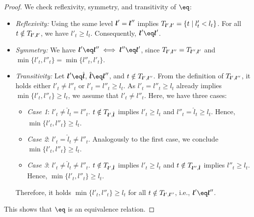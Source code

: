 \begin{proof}
  We check reflexivity, symmetry, and transitivity of $\eq$:
  \begin{itemize}
    \item
    \emph{Reflexivity:}
    Using the same level ${\boldsymbol{l}}' = {\boldsymbol{l}}''$ implies
    $T_{{\boldsymbol{l}}',{\boldsymbol{l}}'} = \{t \mid l'_t < l_t\}$.
    For all $t \notin T_{{\boldsymbol{l}}',{\boldsymbol{l}}'}$, we have $l'_t \ge l_t$.
    Consequently, $\*l' \eq \*l'$.
    
    \item
    \emph{Symmetry:}
    We have
    $\*l' \eq \*l'' \iff \*l'' \eq \*l'$, since
    $T_{{\boldsymbol{l}}',{\boldsymbol{l}}''} = T_{{\boldsymbol{l}}'',{\boldsymbol{l}}'}$ and
    $\min\{l'_t, l''_t\} = \min\{l''_t, l'_t\}$.
    
    \item
    \emph{Transitivity:}
    Let $\*l' \eq \hat{\*l}$, $\hat{\*l} \eq \*l''$, and
    $t \notin T_{{\boldsymbol{l}}',{\boldsymbol{l}}''}$.
    From the definition of $T_{{\boldsymbol{l}}',{\boldsymbol{l}}''}$,
    it holds either $l'_t \not= l''_t$ or $l'_t = l''_t \ge l_t$.
    As $l'_t = l''_t \ge l_t$ already implies $\min\{l'_t, l''_t\} \ge l_t$,
    we assume that $l'_t \not= l''_t$.
    Here, we have three cases:
    \begin{itemize}
      \item
      \emph{Case 1}:
      ${l'_t \not= \hat{l}_t = l''_t}$.
      $t \notin T_{{\boldsymbol{l}}',\hat{{\boldsymbol{l}}}}$ implies $l'_t \ge l_t$ and
      $l''_t = \hat{l}_t \ge l_t$.
      Hence, $\min\{l'_t, l''_t\} \ge l_t$.
      
      \item
      \emph{Case 2}:
      ${l'_t = \hat{l}_t \not= l''_t}$.
      Analogously to the first case, we conclude $\min\{l'_t, l''_t\} \ge l_t$.
      
      \item
      \emph{Case 3}:
      ${l'_t \not= \hat{l}_t \not= l''_t}$.
      $t \notin T_{{\boldsymbol{l}}',\hat{{\boldsymbol{l}}}}$ implies $l'_t \ge l_t$ and
      $t \notin T_{{\boldsymbol{l}}'',\hat{{\boldsymbol{l}}}}$ implies $l''_t \ge l_t$.
      Hence, $\min\{l'_t, l''_t\} \ge l_t$.
    \end{itemize}
    Therefore, it holds $\min\{l'_t, l''_t\} \ge l_t$
    for all $t \notin T_{{\boldsymbol{l}}',{\boldsymbol{l}}''}$, i.e., $\*l' \eq \*l''$.
  \end{itemize}
  This shows that $\eq$ is an equivalence relation.
\end{proof}


\lemmaCombiTechniqueIdenticalValues*

